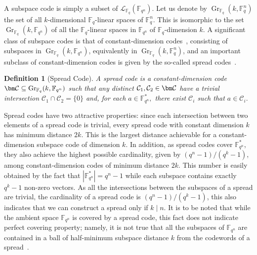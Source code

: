 \documentclass{article}
\newtheorem{definition}{Definition}
\newcommand{\Fq}{\mathbb{F}_{q}}
\newcommand{\Fqn}{\mathbb{F}_{q^n}}
\newcommand{\calC}{\mathcal{C}}
\newcommand{\calL}{\mathcal{L}}
\DeclareMathOperator{\Gr}{Gr}
\begin{document}
A subspace code is simply a subset of $\calL_{\Fq}(\Fqn).$
Let us denote by $\Gr_{\Fq}(k,\Fq^n)$ the set of all $k$-dimensional $\Fq$-linear spaces of $\Fq^n.$
This is isomorphic to the set $\Gr_{\Fq}(k, \Fqn)$
of all the $\Fq$-linear spaces in $\Fqn$ of $\Fq$-dimension $k$. 
A significant class of subspace codes is that of constant-dimension codes~\cite{Kotter08},
consisting of subspaces in $\Gr_{\Fq}(k, \Fqn)$, equivalently in $\Gr_{\Fq}(k,\Fq^n)$, and an important subclass of constant-dimension codes is given by the so-called spread codes~\cite{Gorla08}.
\begin{definition}[Spread Code] \label{def:spread_code}
   A spread code is a constant-dimension code $\bm \calC\subseteq \Gr_{\Fq}(k, \Fqn)$ such that any distinct $\calC_1, \calC_2 \in \bm \calC$ have a trivial intersection $\calC_1 \cap \calC_2 = \{ 0\}$
   and, for each $a \in \Fqn^*,$ there exist $\calC_i$ such that $a \in \calC_i.$
\end{definition}
Spread codes have two attractive properties:
since each intersection between two elements of a spread code is trivial, every spread code with constant dimension $k$ has  minimum distance $2k$.
This is the largest distance achievable for a constant-dimension subspace code of dimension $k$.
In addition, as spread codes cover $\Fqn^*$, they also achieve the highest possible cardinality, given by $(q^n -1)/(q^k -1)$, among constant-dimension codes of minimum distance $2k$.
This number is easily obtained by the fact that $|\Fqn^*| = q^n - 1$  while each subspace contains exactly $q^k-1$ non-zero vectors.
As all the intersections between the subspaces of a spread are trivial, the cardinality of a spread code is $(q^n -1)/(q^k -1)$, this also indicates that we can construct a spread only if $k \mid n.$
It is to be noted that while the ambient space $\Fqn$ is covered by a spread code, this fact does not indicate perfect covering property; namely, it is not true that all the subspaces of $\Fqn$ are contained in a ball of half-minimum subspace distance $k$ from the codewords of a spread~\cite{Martin1995}.
\end{document}
